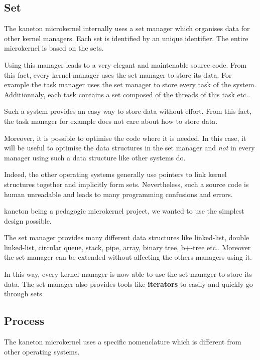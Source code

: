 \begin{multicols}{2}
%
%

\subsection{Set}

The kaneton microkernel internally uses a set manager which organises data
for other kernel managers. Each set is identified by an unique identifier.
The entire microkernel is based on the sets.

Using this manager leads to a very elegant and maintenable source code. From
this fact, every kernel manager uses the set manager to store its data. For
example the task manager uses the set manager to store every task of the
system. Additionnaly, each task contains a set composed of the threads of
this task etc..

Such a system provides an easy way to store data without effort. From this
fact, the task manager for example does not care about how to store data.

Moreover, it is possible to optimise the code where it is needed. In this
case, it will be useful to optimise the data structures in the set manager
and \textit{not} in every manager using such a data structure like
other systems do.

Indeed, the other operating systems generally use pointers to link kernel
structures together and implicitly form sets. Nevertheless, such a source code
is human unreadable and leads to many programming confusions and errors.

kaneton being a pedagogic microkernel project, we wanted to use the simplest
design possible.

The set manager provides many different data structures like linked-list,
double linked-list, circular queue, stack, pipe, array, binary tree, b+-tree
etc.. Moreover the set manager can be extended without affecting the others
managers using it.

In this way, every kernel manager is now able to use the set manager to
store its data. The set manager also provides tools like \textbf{iterators}
to easily and quickly go through sets.

%
%

\subsection{Process}

The kaneton microkernel uses a specific nomenclature which is different
from other operating systems.


\end{multicols}
